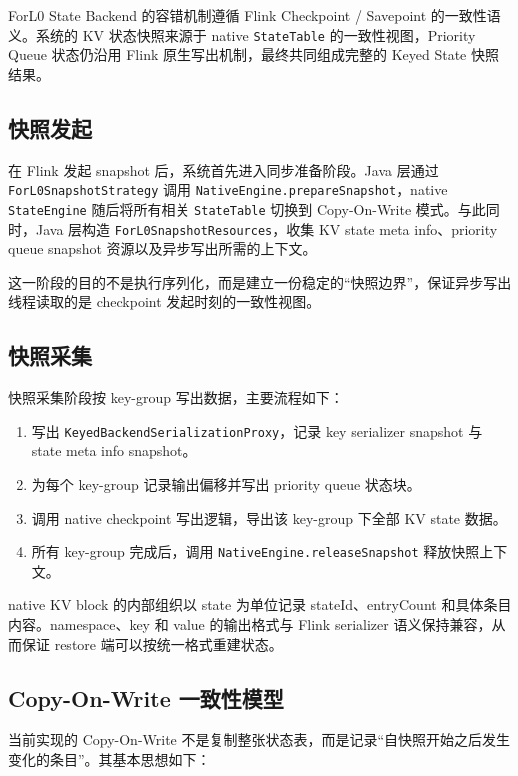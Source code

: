 \documentclass[a4paper,11pt]{article}
\newcommand{\project}{ForL0 State Backend}
\begin{document}
\project{} 的容错机制遵循 Flink Checkpoint / Savepoint 的一致性语义。系统的 KV 状态快照来源于 native \texttt{StateTable} 的一致性视图，Priority Queue 状态仍沿用 Flink 原生写出机制，最终共同组成完整的 Keyed State 快照结果。

\subsection{快照发起}

在 Flink 发起 snapshot 后，系统首先进入同步准备阶段。Java 层通过 \texttt{ForL0SnapshotStrategy} 调用 \texttt{NativeEngine.prepareSnapshot}，native \texttt{StateEngine} 随后将所有相关 \texttt{StateTable} 切换到 Copy-On-Write 模式。与此同时，Java 层构造 \texttt{ForL0SnapshotResources}，收集 KV state meta info、priority queue snapshot 资源以及异步写出所需的上下文。

这一阶段的目的不是执行序列化，而是建立一份稳定的“快照边界”，保证异步写出线程读取的是 checkpoint 发起时刻的一致性视图。

\subsection{快照采集}

快照采集阶段按 key-group 写出数据，主要流程如下：

\begin{enumerate}
  \item 写出 \texttt{KeyedBackendSerializationProxy}，记录 key serializer snapshot 与 state meta info snapshot。
  \item 为每个 key-group 记录输出偏移并写出 priority queue 状态块。
  \item 调用 native checkpoint 写出逻辑，导出该 key-group 下全部 KV state 数据。
  \item 所有 key-group 完成后，调用 \texttt{NativeEngine.releaseSnapshot} 释放快照上下文。
\end{enumerate}

native KV block 的内部组织以 state 为单位记录 stateId、entryCount 和具体条目内容。namespace、key 和 value 的输出格式与 Flink serializer 语义保持兼容，从而保证 restore 端可以按统一格式重建状态。

\subsection{Copy-On-Write 一致性模型}

当前实现的 Copy-On-Write 不是复制整张状态表，而是记录“自快照开始之后发生变化的条目”。其基本思想如下：
\end{document}
